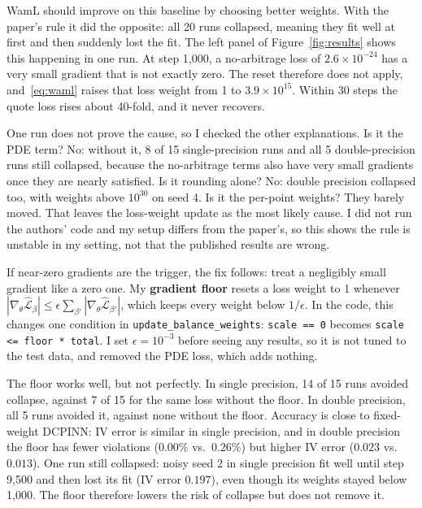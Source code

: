 \documentclass[10pt]{article}
\begin{document}
WamL should improve on this baseline by choosing better weights. With the paper's rule it did the opposite: all 20 runs collapsed, meaning they fit well at first and then suddenly lost the fit. The left panel of Figure~\ref{fig:results} shows this happening in one run. At step 1,000, a no-arbitrage loss of $2.6\times10^{-24}$ has a very small gradient that is not exactly zero. The reset therefore does not apply, and~\eqref{eq:waml} raises that loss weight from 1 to $3.9\times10^{15}$. Within 30 steps the quote loss rises about 40-fold, and it never recovers.

One run does not prove the cause, so I checked the other explanations. Is it the PDE term? No: without it, 8 of 15 single-precision runs and all 5 double-precision runs still collapsed, because the no-arbitrage terms also have very small gradients once they are nearly satisfied. Is it rounding alone? No: double precision collapsed too, with weights above $10^{30}$ on seed 4. Is it the per-point weights? They barely moved. That leaves the loss-weight update as the most likely cause. I did not run the authors' code and my setup differs from the paper's, so this shows the rule is unstable in my setting, not that the published results are wrong.

If near-zero gradients are the trigger, the fix follows: treat a negligibly small gradient like a zero one. My \textbf{gradient floor} resets a loss weight to 1 whenever $|\nabla_\theta\hat{\mathcal L}_\beta|\le\epsilon\sum_{\beta'}|\nabla_\theta\hat{\mathcal L}_{\beta'}|$, which keeps every weight below $1/\epsilon$. In the code, this changes one condition in \texttt{update\_balance\_weights}: \mbox{\texttt{scale == 0}} becomes \mbox{\texttt{scale <= floor * total}}. I set $\epsilon=10^{-3}$ before seeing any results, so it is not tuned to the test data, and removed the PDE loss, which adds nothing.

The floor works well, but not perfectly. In single precision, 14 of 15 runs avoided collapse, against 7 of 15 for the same loss without the floor. In double precision, all 5 runs avoided it, against none without the floor. Accuracy is close to fixed-weight DCPINN: IV error is similar in single precision, and in double precision the floor has fewer violations ($0.00\%$ vs.\ $0.26\%$) but higher IV error ($0.023$ vs.\ $0.013$). One run still collapsed: noisy seed 2 in single precision fit well until step 9,500 and then lost its fit (IV error $0.197$), even though its weights stayed below 1,000. The floor therefore lowers the risk of collapse but does not remove it.
\end{document}
